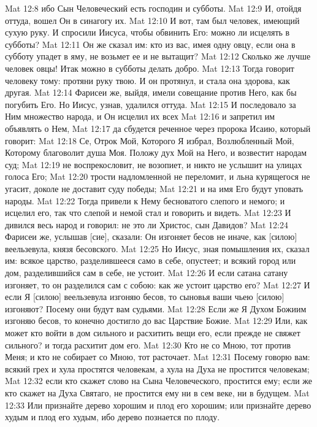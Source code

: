 Mat 12:8  ибо Сын Человеческий есть господин и субботы.
Mat 12:9  И, отойдя оттуда, вошел Он в синагогу их.
Mat 12:10  И вот, там был человек, имеющий сухую руку. И спросили Иисуса, чтобы обвинить Его: можно ли исцелять в субботы?
Mat 12:11  Он же сказал им: кто из вас, имея одну овцу, если она в субботу упадет в яму, не возьмет ее и не вытащит?
Mat 12:12  Сколько же лучше человек овцы! Итак можно в субботы делать добро.
Mat 12:13  Тогда говорит человеку тому: протяни руку твою. И он протянул, и стала она здорова, как другая.
Mat 12:14  Фарисеи же, выйдя, имели совещание против Него, как бы погубить Его. Но Иисус, узнав, удалился оттуда.
Mat 12:15  И последовало за Ним множество народа, и Он исцелил их всех
Mat 12:16  и запретил им объявлять о Нем,
Mat 12:17  да сбудется реченное через пророка Исаию, который говорит:
Mat 12:18  Се, Отрок Мой, Которого Я избрал, Возлюбленный Мой, Которому благоволит душа Моя. Положу дух Мой на Него, и возвестит народам суд;
Mat 12:19  не воспрекословит, не возопиет, и никто не услышит на улицах голоса Его;
Mat 12:20  трости надломленной не переломит, и льна курящегося не угасит, доколе не доставит суду победы;
Mat 12:21  и на имя Его будут уповать народы.
Mat 12:22  Тогда привели к Нему бесноватого слепого и немого; и исцелил его, так что слепой и немой стал и говорить и видеть.
Mat 12:23  И дивился весь народ и говорил: не это ли Христос, сын Давидов?
Mat 12:24  Фарисеи же, услышав [сие], сказали: Он изгоняет бесов не иначе, как [силою] веельзевула, князя бесовского.
Mat 12:25  Но Иисус, зная помышления их, сказал им: всякое царство, разделившееся само в себе, опустеет; и всякий город или дом, разделившийся сам в себе, не устоит.
Mat 12:26  И если сатана сатану изгоняет, то он разделился сам с собою: как же устоит царство его?
Mat 12:27  И если Я [силою] веельзевула изгоняю бесов, то сыновья ваши чьею [силою] изгоняют? Посему они будут вам судьями.
Mat 12:28  Если же Я Духом Божиим изгоняю бесов, то конечно достигло до вас Царствие Божие.
Mat 12:29  Или, как может кто войти в дом сильного и расхитить вещи его, если прежде не свяжет сильного? и тогда расхитит дом его.
Mat 12:30  Кто не со Мною, тот против Меня; и кто не собирает со Мною, тот расточает.
Mat 12:31  Посему говорю вам: всякий грех и хула простятся человекам, а хула на Духа не простится человекам;
Mat 12:32  если кто скажет слово на Сына Человеческого, простится ему; если же кто скажет на Духа Святаго, не простится ему ни в сем веке, ни в будущем.
Mat 12:33  Или признайте дерево хорошим и плод его хорошим; или признайте дерево худым и плод его худым, ибо дерево познается по плоду.
